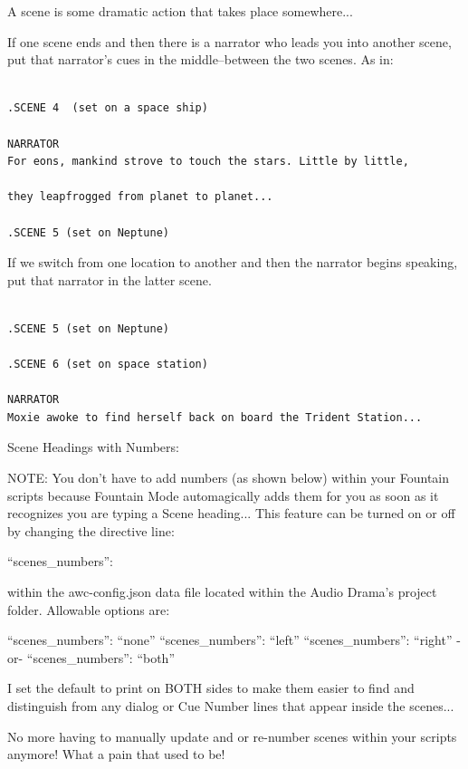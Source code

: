 \documentclass[openleft,oneside,showtrims]{memoir}
\begin{document}
A scene is some dramatic action that takes place somewhere...

If one scene ends and then there is a narrator who leads you into another scene, put that narrator's cues in the middle--between the two scenes. As in:

\lstset{language=fountain,label= ,caption= ,captionpos=b,numbers=none}
\begin{lstlisting}

.SCENE 4  (set on a space ship)

NARRATOR
For eons, mankind strove to touch the stars. Little by little,
  
they leapfrogged from planet to planet...

.SCENE 5 (set on Neptune)

\end{lstlisting}

If we switch from one location to another and then the narrator begins speaking, put that narrator in the latter scene.

\lstset{language=fountain,label= ,caption= ,captionpos=b,numbers=none}
\begin{lstlisting}

.SCENE 5 (set on Neptune)

.SCENE 6 (set on space station)

NARRATOR
Moxie awoke to find herself back on board the Trident Station...

\end{lstlisting}

Scene Headings with Numbers:

NOTE: You don't have to add numbers (as shown below) within your Fountain scripts because Fountain Mode automagically adds them for you as soon as it recognizes you are typing a Scene heading... This feature can be turned on or off by changing the directive line:

``scenes\_numbers'':

within the awc-config.json data file located within the Audio Drama's project folder. 
Allowable options are:

     ``scenes\_numbers'': ``none''
     ``scenes\_numbers'': ``left''
     ``scenes\_numbers'': ``right''
-or-
     ``scenes\_numbers'': ``both''

I set the default to print on BOTH sides to make them easier to find and distinguish from any dialog or Cue Number lines that appear inside the scenes...

No more having to manually update and or re-number scenes within your scripts anymore! What a pain that used to be!
\end{document}
